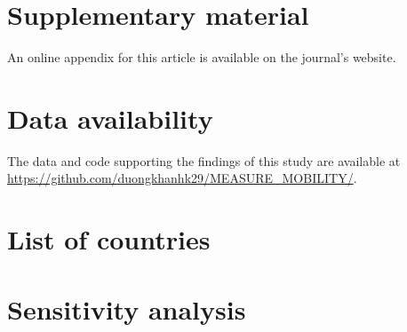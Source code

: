 \section*{Supplementary material}
An online appendix for this article is available on the journal's website.

\section*{Data availability}
The data and code supporting the findings of this study are available at \url{https://github.com/duongkhanhk29/MEASURE_MOBILITY/}.





\appendix

\newpage
\section{List of countries} \label{app:list}


\newpage
\section{Sensitivity analysis} \label{app:sensitive}



